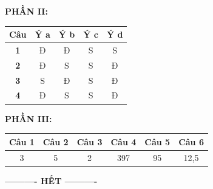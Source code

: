 \documentclass[12pt,a4paper]{article}
\begin{document}
\vspace{0.2cm}
\noindent\textbf{PHẦN II:}
\begin{center}
\begin{tabular}{|c|c|c|c|c|}
\hline
\textbf{Câu} & \textbf{Ý a} & \textbf{Ý b} & \textbf{Ý c} & \textbf{Ý d} \\ \hline
\textbf{1} & Đ & Đ & S & S \\ \hline
\textbf{2} & Đ & S & S & Đ \\ \hline
\textbf{3} & S & Đ & S & Đ \\ \hline
\textbf{4} & Đ & S & S & Đ \\ \hline
\end{tabular}
\end{center}

\vspace{0.2cm}
\noindent\textbf{PHẦN III:}
\begin{center}
\begin{tabular}{|c|c|c|c|c|c|}
\hline
\textbf{Câu 1} & \textbf{Câu 2} & \textbf{Câu 3} & \textbf{Câu 4} & \textbf{Câu 5} & \textbf{Câu 6} \\ \hline
3 & 5 & 2 & 397 & 95 & 12,5 \\ \hline
\end{tabular}
\end{center}

\par\vspace{0.1cm}
\centerline{\textbf{---------- HẾT ----------}}
\end{document}
